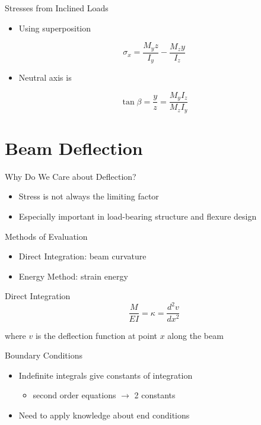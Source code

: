 \documentclass[10pt, svgnames]{beamer}
\begin{document}
\begin{frame}[label={sec:org59c9eee}]{Stresses from Inclined Loads}
\begin{itemize}
\item Using superposition
\end{itemize}

\[\sigma_x = \frac{M_y z}{I_y} - \frac{M_z y}{I_z}\]

\begin{itemize}
\item Neutral axis is
\end{itemize}

\[\tan \beta = \frac{y}{z} = \frac{M_y I_z}{M_z I_y}\]
\end{frame}

\section{Beam Deflection}
\label{beam-deflection}
\begin{frame}[label={sec:org515b48e}]{Why Do We Care about Deflection?}
\begin{itemize}
\item Stress is not always the limiting factor

\item Especially important in load-bearing structure and flexure design
\end{itemize}
\end{frame}

\begin{frame}[label={sec:orgdd4f6ed}]{Methods of Evaluation}
\begin{itemize}
\item Direct Integration: beam curvature

\item Energy Method: strain energy
\end{itemize}
\end{frame}

\begin{frame}[label={sec:org1f54b42}]{Direct Integration}
\[\frac{M}{EI} = \kappa = \frac{d^2 v}{dx^2}\]

where \(v\) is the deflection function at point \(x\) along the beam
\end{frame}

\begin{frame}[label={sec:org922ca41}]{Boundary Conditions}
\begin{itemize}
\item Indefinite integrals give constants of integration

\begin{itemize}
\item second order equations \(\rightarrow\) 2 constants
\end{itemize}

\item Need to apply knowledge about end conditions
\end{itemize}
\end{frame}
\end{document}
